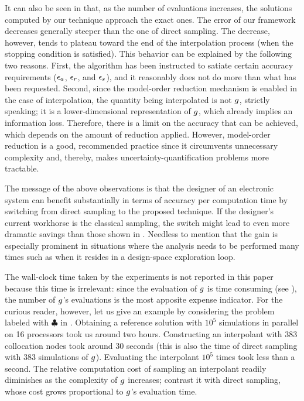 It can also be seen in  that, as the number of evaluations
increases, the solutions computed by our technique approach the exact ones. The
error of our framework decreases generally steeper than the one of direct
sampling. The decrease, however, tends to plateau toward the end of the
interpolation process (when the stopping condition is satisfied). This behavior
can be explained by the following two reasons. First, the algorithm has been
instructed to satiate certain accuracy requirements ($\epsilon_a$, $\epsilon_r$, and
$\epsilon_s$), and it reasonably does not do more than what has been requested.
Second, since the model-order reduction mechanism is enabled in the case of
interpolation, the quantity being interpolated is not $g$, strictly speaking;
it is a lower-dimensional representation of $g$, which already implies an
information loss. Therefore, there is a limit on the accuracy that can be
achieved, which depends on the amount of reduction applied. However, model-order
reduction is a good, recommended practice since it circumvents unnecessary
complexity and, thereby, makes uncertainty-quantification problems more
tractable.

The message of the above observations is that the designer of an electronic
system can benefit substantially in terms of accuracy per computation time by
switching from direct sampling to the proposed technique. If the designer's
current workhorse is the classical  sampling, the switch might lead to
even more dramatic savings than those shown in . Needless to
mention that the gain is especially prominent in situations where the analysis
needs to be performed many times such as when it resides in a design-space
exploration loop.

\begin{remark}
The wall-clock time taken by the experiments is not reported in this paper
because this time is irrelevant: since the evaluation of $g$ is time consuming
(see ), the number of $g$'s evaluations is the most apposite
expense indicator. For the curious reader, however, let us give an example by
considering the problem labeled with $\clubsuit$ in . Obtaining a
reference solution with $10^5$ simulations in parallel on 16 processors took us
around two hours. Constructing an interpolant with 383 collocation nodes took
around 30 seconds (this is also the time of direct sampling with 383 simulations
of $g$). Evaluating the interpolant $10^5$ times took less than a second. The
relative computation cost of sampling an interpolant readily diminishes as the
complexity of $g$ increases; contrast it with direct sampling, whose cost grows
proportional to $g$'s evaluation time.
\end{remark}
